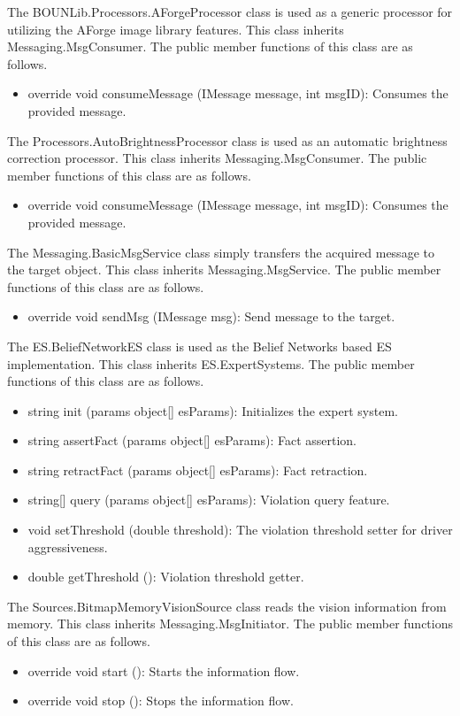 \documentclass[a4paper,oneside,12pt]{report}
\begin{document}
The BOUNLib.Processors.AForgeProcessor class is used as a generic processor for utilizing the AForge image library features.
This class inherits Messaging.MsgConsumer. The public member functions of this class are as follows.
\begin{itemize}
\item override void consumeMessage (IMessage message, int msgID): Consumes the provided message. 
\end{itemize}

The Processors.AutoBrightnessProcessor class is used as an automatic brightness correction processor.
This class inherits Messaging.MsgConsumer. The public member functions of this class are as follows.
\begin{itemize}
\item override void consumeMessage (IMessage message, int msgID): Consumes the provided message. 
\end{itemize}

The Messaging.BasicMsgService class simply transfers the acquired message to the target object.
This class inherits Messaging.MsgService. The public member functions of this class are as follows.
\begin{itemize}
\item override void sendMsg (IMessage msg): Send message to the target. 
\end{itemize}

The ES.BeliefNetworkES class is used as the Belief Networks based ES implementation.
This class inherits ES.ExpertSystems. The public member functions of this class are as follows.
\begin{itemize}
\item string init (params object[] esParams): Initializes the expert system. 
\item string assertFact (params object[] esParams): Fact assertion. 
\item string retractFact (params object[] esParams): Fact retraction. 
\item string[] query (params object[] esParams): Violation query feature. 
\item void setThreshold (double threshold): The violation threshold setter for driver aggressiveness. 
\item double getThreshold (): Violation threshold getter. 
\end{itemize}

The Sources.BitmapMemoryVisionSource class reads the vision information from memory.
This class inherits Messaging.MsgInitiator. The public member functions of this class are as follows.
\begin{itemize}
\item override void start (): Starts the information flow. 
\item override void stop (): Stops the information flow. 
\end{itemize}
\end{document}
